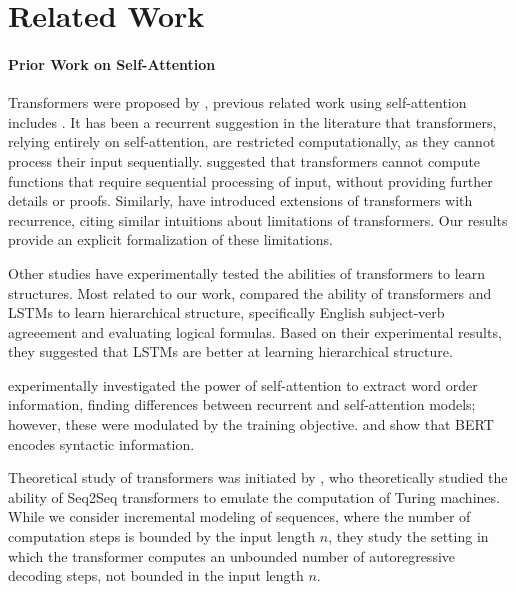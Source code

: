 \documentclass[11pt,a4paper]{article}
\begin{document}
\section{Related Work}\label{sec:related}
\paragraph{Prior Work on Self-Attention}
Transformers were proposed by \citet{vaswani2017attention}, previous related work using self-attention includes \citet{cheng2016long,parikh2016decomposable,paulus2017deep,lin2017structured}.
It has been a recurrent suggestion in the literature that transformers, relying entirely on self-attention, are restricted computationally, as they cannot process their input sequentially.
\citet{dehghani2018universal} suggested that %
transformers cannot compute functions that require sequential processing of input, without providing further details or proofs.
Similarly, \citet{shen2018disan,chen2018best,hao2019modeling} have introduced extensions of transformers with recurrence, citing similar intuitions about limitations of transformers.
Our results provide an explicit formalization of these limitations.

Other studies have experimentally tested the abilities of transformers to learn structures.
Most related to our work, \citet{tran2018importance} compared the ability of transformers and LSTMs to learn hierarchical structure, specifically English subject-verb agreeement and evaluating logical formulas.
Based on their experimental results, they suggested that LSTMs are better at learning hierarchical structure.

\citet{yang2019assessing} experimentally investigated the power of self-attention to extract word order information, finding differences between recurrent and self-attention models; however, these were modulated by the training objective.
\citet{lin2019open} and \citet{tenney2019bert} show that BERT \cite{devlin2018bert} encodes syntactic information.

Theoretical study of transformers was initiated by \citet{perez2019turing}, who theoretically studied the ability of Seq2Seq transformers to emulate the computation of Turing machines.
While we consider incremental modeling of sequences, where the number of computation steps is bounded by the input length $n$, they study the setting in which the transformer computes an unbounded number of autoregressive decoding steps, not bounded in the input length $n$.
\end{document}

